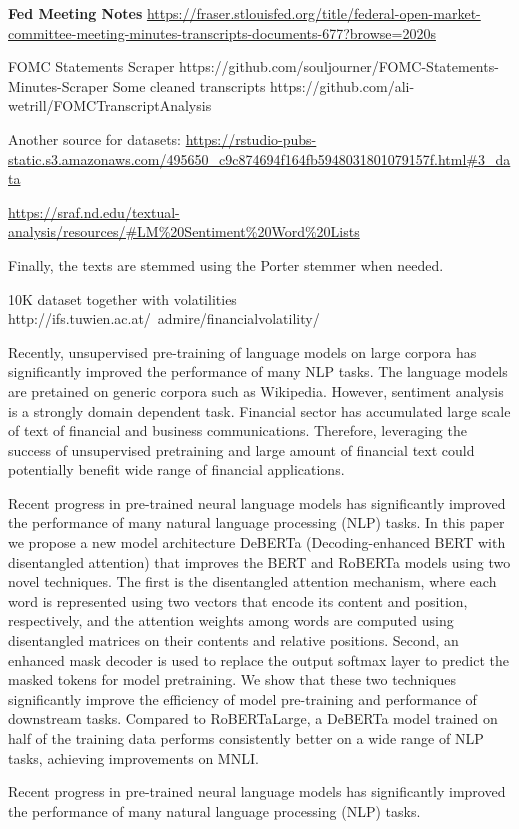 \documentclass[11pt]{article}
\begin{document}
\textbf{Fed Meeting Notes}
\url{https://fraser.stlouisfed.org/title/federal-open-market-committee-meeting-minutes-transcripts-documents-677?browse=2020s}

FOMC Statements Scraper
https://github.com/souljourner/FOMC-Statements-Minutes-Scraper
Some cleaned transcripts
https://github.com/ali-wetrill/FOMCTranscriptAnalysis

Another source for datasets: \url{https://rstudio-pubs-static.s3.amazonaws.com/495650_c9c874694f164fb5948031801079157f.html#3_data}

\url{https://sraf.nd.edu/textual-analysis/resources/#LM%20Sentiment%20Word%20Lists}

Finally, the texts are stemmed using the Porter stemmer when needed.

10K dataset together with volatilities
http://ifs.tuwien.ac.at/~admire/financialvolatility/


Recently, unsupervised pre-training of language models on large corpora has significantly improved the performance of many NLP tasks. The
language models are pretained on generic corpora such as Wikipedia. However, sentiment analysis
is a strongly domain dependent task. Financial sector has accumulated large scale of text of financial and business communications. Therefore,
leveraging the success of unsupervised pretraining and large amount of
financial text could potentially benefit wide range of financial applications.

Recent progress in pre-trained neural language models has significantly improved the performance of many natural language processing (NLP) tasks. In this paper we
propose a new model architecture DeBERTa (Decoding-enhanced BERT with disentangled attention) that improves the BERT and RoBERTa models using two novel
techniques. The first is the disentangled attention mechanism, where each word is represented using two vectors that encode its content and position, respectively,
and the attention weights among words are computed using disentangled
matrices on their contents and relative positions. Second, an enhanced mask decoder is used
to replace the output softmax layer to predict the masked tokens for model pretraining. We show that these two techniques significantly improve the efficiency of
model pre-training and performance of downstream tasks. Compared to RoBERTaLarge, a DeBERTa model trained on half of the training data performs consistently
better on a wide range of NLP tasks, achieving improvements on MNLI.

Recent progress in pre-trained neural language models has significantly improved the performance of many natural language processing (NLP) tasks.
\end{document}
